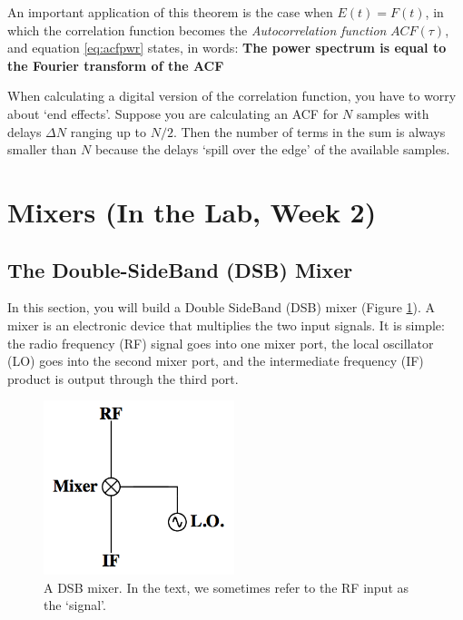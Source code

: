 \documentclass[12pt,preprint]{aastex}
\begin{document}
An important application of this theorem is the case when
$E(t)=F(t)$, in which the correlation function becomes the {\it
  Autocorrelation function} $ACF(\tau)$, and equation \ref{eq:acfpwr}
states, in words: {\bf The power spectrum is equal to the Fourier
  transform of the ACF}

When calculating a digital version of the correlation function, you have
to worry about `end effects'. Suppose you are calculating an ACF for $N$
samples with delays $\Delta N$ ranging up to $N/2$. Then the number of
terms in the sum is always smaller than $N$ because the delays `spill
over the edge' of the available samples. 





\section{Mixers (In the Lab, Week 2)} \label{mixersect}

\subsection{The Double-SideBand (DSB) Mixer} \label{sectdsb}

In this section, you will build a Double SideBand (DSB) mixer (Figure \ref{dsb}).
A mixer is an electronic device that multiplies the two input signals. It is simple: the
radio frequency (RF) signal goes into one mixer port, the local oscillator (LO) goes into the second
mixer port, and the intermediate frequency (IF) product is output through the third port.

\begin{figure}[h!]
\begin{center}
  \includegraphics[height=2in]{dsbmixer.png}
\end{center}
\caption{\footnotesize A DSB mixer. In the text, we sometimes refer to
  the RF input as the `signal'. \label{dsb}}
\end{figure}
\end{document}
